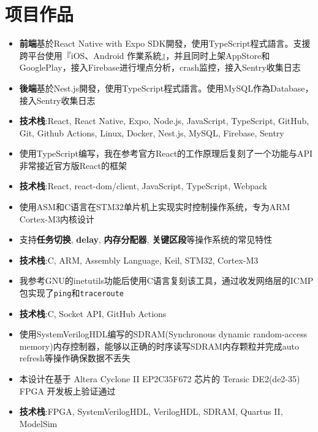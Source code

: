 \documentclass{resume}
\newcommand{\iconsection}[2]{
    \section[\texorpdfstring{#2}{#2}]{\faIcon{#1}\quad #2}
}
\begin{document}
    \iconsection{list}{项目作品}
    \begin{itemize}
        \item \textbf{前端}基於React Native with Expo SDK開發，使用TypeScript程式語言。支援跨平台使用『iOS、Android 作業系統』，并且同时上架AppStore和GooglePlay，接入Firebase进行埋点分析，crash监控，接入Sentry收集日志
        \item \textbf{後端}基於Nest.js開發，使用TypeScript程式語言。使用MySQL作為Database，接入Sentry收集日志
        \item \textbf{技术栈}:React, React Native, Expo, Node.js, JavaScript, TypeScript, GitHub, Git, Github Actions, Linux, Docker, Nest.js, MySQL, Firebase, Sentry
    \end{itemize}
    \begin{itemize}
        \item 使用TypeScript编写，我在参考官方React的工作原理后复刻了一个功能与API非常接近官方版React的框架
        \item \textbf{技术栈}:React, react-dom/client, JavaScript, TypeScript, Webpack
    \end{itemize}
    \begin{itemize}
        \item 使用ASM和C语言在STM32单片机上实现实时控制操作系统，专为ARM Cortex-M3内核设计
        \item 支持\textbf{任务切换}, \textbf{delay}, \textbf{内存分配器}, \textbf{关键区段}等操作系统的常见特性
        \item \textbf{技术栈}:C, ARM, Assembly Language, Keil, STM32, Cortex-M3
    \end{itemize}
    \begin{itemize}
        \item 我参考GNU的inetutils功能后使用C语言复刻该工具，通过收发网络层的ICMP包实现了\texttt{ping}和\texttt{traceroute}
        \item \textbf{技术栈}:C, Socket API, GitHub Actions
    \end{itemize}
    \begin{itemize}
        \item 使用SystemVerilogHDL编写的SDRAM(Synchronous dynamic random-access memory)内存控制器，能够以正确的时序读写SDRAM内存颗粒并完成auto refresh等操作确保数据不丢失
        \item 本设计在基于 Altera Cyclone II EP2C35F672 芯片的 Terasic DE2(de2-35) FPGA 开发板上验证通过
        \item \textbf{技术栈}:FPGA, SystemVerilogHDL, VerilogHDL, SDRAM, Quartus II, ModelSim
    \end{itemize}
\end{document}
